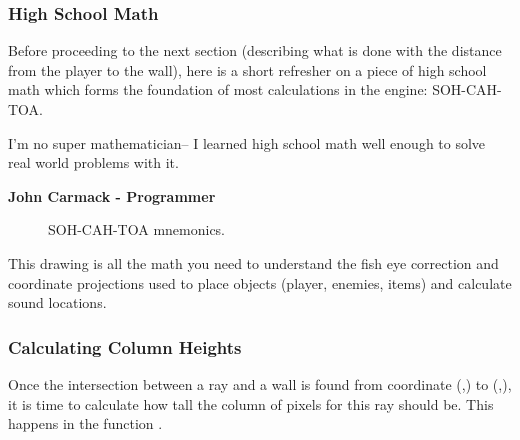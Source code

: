 \subsubsection{High School Math}
Before proceeding to the next section (describing what is done with the distance from the player to the wall), here is a short refresher on a piece of high school math which forms the foundation of most calculations in the engine: SOH-CAH-TOA.\\
\par
 \begin{fancyquotes}
  I'm no super mathematician-- I learned high school math well enough to solve real world problems with it.\\
 \par
\textbf{John Carmack - Programmer}
 \end{fancyquotes}


\par
\begin{figure}[H]
\centering
 
 \caption{SOH-CAH-TOA mnemonics.}
\end{figure}



This drawing is all the math you need to understand the fish eye correction and coordinate projections used to place objects (player, enemies, items) and calculate sound locations.\\






















\subsubsection{Calculating Column Heights}
Once the intersection between a ray and a wall is found from coordinate (,) to (,), it is time to calculate how tall the column of pixels for this ray should be. This happens in the function .\\

\begin{minipage}{\textwidth}

\end{minipage}

